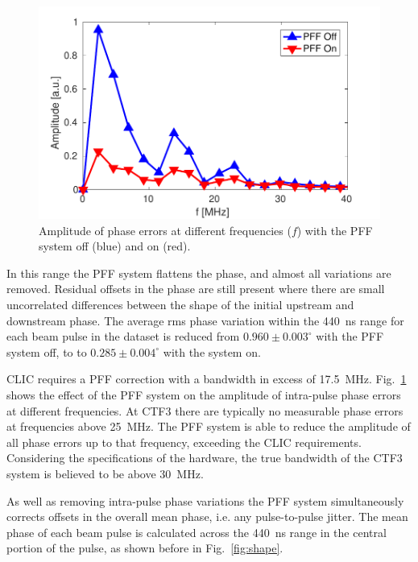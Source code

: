\documentclass[%
 reprint,
 superscriptaddress,
 amsmath,
 amssymb,
 prl,
]{revtex4-1}
\begin{document}
\begin{figure}
	\includegraphics[width=\columnwidth]{figs/fft}
	\caption{\label{fig:fft}Amplitude of phase errors at different frequencies 
		(\(f\)) with the PFF system off (blue) and on (red).}
\end{figure}

In this range the PFF system flattens the phase, 
and almost all variations are removed. Residual offsets in the phase are still 
present where there are small uncorrelated differences between the shape of the 
initial upstream and downstream phase. 
The average rms phase variation within the 440~ns range 
for each beam pulse in the dataset is reduced from \(0.960\pm0.003^\circ\) with 
the PFF system off, to to \(0.285\pm0.004^\circ\) with the system on.

CLIC requires a PFF correction with a bandwidth in excess of 17.5~MHz. 
Fig.~\ref{fig:fft} shows the effect of the PFF system on the amplitude of 
intra-pulse phase errors at different frequencies. At CTF3 there are typically 
no measurable phase errors at frequencies above 25~MHz. The PFF system is able 
to reduce the amplitude of all phase errors up to that frequency, exceeding the 
CLIC requirements. Considering the specifications of the hardware, the true 
bandwidth of the CTF3 system is believed to be above 30~MHz.

As well as removing intra-pulse phase variations the PFF system simultaneously 
corrects offsets in the overall mean phase, i.e. any pulse-to-pulse jitter. The 
mean phase of each beam pulse is calculated across the 440~ns range in the 
central portion of the pulse, as shown before in Fig.~\ref{fig:shape}.
\end{document}
